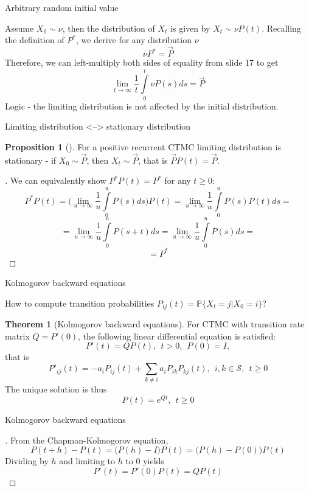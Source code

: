 \documentclass{beamer}%
\theoremstyle{definition}
\newtheorem{mytheor}[theorem]{Theorem}
\newtheorem{proposition}[theorem]{Proposition}
\renewcommand{\P}{\mathbb{P}}
\begin{document}
\begin{frame}{Arbitrary random initial value}

Assume $X_0\sim\nu$, then the distribution of $X_t$ is given by $X_t\sim\nu P(t)$. Recalling the definition of $P^*$, we derive for any distribution $\nu$
$$\nu P^*=\vec{P}$$
Therefore, we can left-multiply both sides of equality from slide 17 to get
$$\lim\limits_{t\to\infty}\frac{1}{t}\int\limits_0^t\nu P(s)ds=\vec{P}$$
Logic - the limiting distribution is not affected by the initial distribution.

\end{frame}


\begin{frame}{Limiting distribution <--> stationary distribution}

\begin{proposition}[]
For a positive recurrent CTMC limiting distribution is stationary - if $X_0\sim\vec{P}$, then $X_t\sim\vec{P}$, that is $\vec{P}P(t)=\vec{P}$.
\end{proposition}
\begin{proof}[]
We can equivalently show $P^*P(t)=P^*$ for any $t\geqslant0$:
$$P^*P(t)=\bigg(\lim\limits_{u\to\infty}\frac{1}{u}\int\limits_0^uP(s)ds\bigg)P(t)=\lim\limits_{u\to\infty}\frac{1}{u}\int\limits_0^uP(s)P(t)ds=$$
$$=\lim\limits_{u\to\infty}\frac{1}{u}\int\limits_0^uP(s+t)ds=\lim\limits_{u\to\infty}\frac{1}{u}\int\limits_0^uP(s)ds=$$
$$=P^*$$
\end{proof}

\end{frame}


\begin{frame}{Kolmogorov backward equations}

How to compute transition probabilities $P_{ij}(t)=\P\{X_t=j|X_0=i\}$?
\begin{mytheor}[Kolmogorov backward equations]
For CTMC with transition rate matrix $Q=P'(0)$, the following linear differential equation is satisfied:
$$P'(t)=QP(t), \:\: t>0, \:\: P(0)=I,$$
that is
$$P'_{ij}(t)=-a_iP_{ij}(t)+\sum\limits_{k\neq i}a_iP_{ik}P_{kj}(t), \:\: i, k\in\mathcal{S}, \:\: t\geqslant0$$
The unique solution is thus
$$P(t)=e^{Qt}, \:\: t\geqslant0$$
\end{mytheor}

\end{frame}


\begin{frame}{Kolmogorov backward equations}

\begin{proof}[]
From the Chapman-Kolmogorov equation,
$$P(t+h)-P(t)=\big(P(h)-I\big)P(t)=\big(P(h)-P(0)\big)P(t)$$
Dividing by $h$ and limiting to $h$ to $0$ yields
$$P'(t)=P'(0)P(t)=QP(t)$$
\end{proof}

\end{frame}
\end{document}
